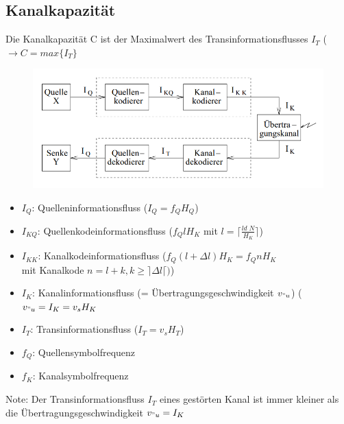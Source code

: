 \documentclass[12pt,a4paper]{article}
\begin{document}
\subsection{Kanalkapazität}
Die Kanalkapazität C ist der Maximalwert des Transinformationsflusses $I_T$ ($\rightarrow C = max\{I_T \}$
\begin{figure}[H]
\centering
\includegraphics[scale=0.5]{./resources/kanal_cap.png}
\end{figure}
\begin{itemize}
\item $I_Q$: Quelleninformationsfluss ($I_Q =  f_Q H_Q$)
\item $I_{KQ}$: Quellenkodeinformationsfluss ($f_Q l H_K$ mit $l = \lceil \frac{ld\; N}{H_K}\rceil$)
\item $I_{KK}$: Kanalkodeinformationsfluss ($f_Q (l+\Delta l) H_K = f_Q n H_K$\\
mit Kanalkode $n= l + k, k \geq \rceil \Delta l \lceil)$)
\item $I_K$: Kanalinformationsfluss (= Übertragungsgeschwindigkeit $v_{"u}$) ($v_{"u} = I_K = v_s H_K$
\item $I_T$: Transinformationsfluss ($I_T = v_s H_T$)
\item $f_Q$: Quellensymbolfrequenz
\item $f_K$: Kanalsymbolfrequenz
\end{itemize}
Note: Der Transinformationsfluss $I_T$ eines gestörten Kanal ist immer kleiner als die Übertragungsgeschwindigkeit $v_{"u} = I_K$
\end{document}
